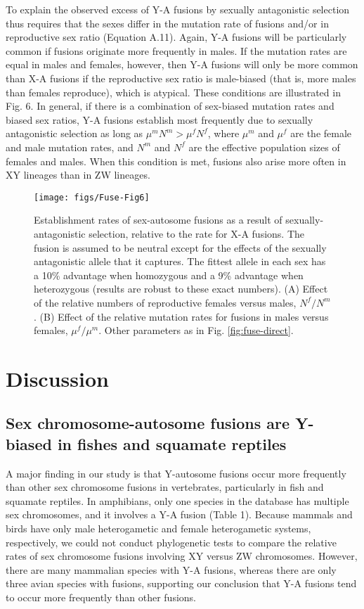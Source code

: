 To explain the observed excess of Y-A fusions by sexually antagonistic selection thus requires that the sexes differ in the mutation rate of fusions and/or in reproductive sex ratio (Equation A.11). Again, Y-A fusions will be particularly common if fusions originate more frequently in males. If the mutation rates are equal in males and females, however, then Y-A fusions will only be more common than X-A fusions if the reproductive sex ratio is male-biased (that is, more males than females reproduce), which is atypical. These conditions are illustrated in Fig. 6. In general, if there is a combination of sex-biased mutation rates and biased sex ratios, Y-A fusions establish most frequently due to sexually antagonistic selection as long as $\mu^m N^m > \mu^fN^f$, where $\mu^m$ and $\mu^f$ are the female and male mutation rates, and $N^m$ and $N^f$ are the effective population sizes of females and males. When this condition is met, fusions also arise more often in XY lineages than in ZW lineages.

\begin{figure}
\centering
\texttt{[image: figs/Fuse-Fig6]}
\caption[Establishment rates of sex-autosome fusions under SA selection]{Establishment rates of sex-autosome fusions as a result of sexually-antagonistic selection, relative to the rate for X-A fusions. The fusion is assumed to be neutral except for the effects of the sexually antagonistic allele that it captures. The fittest allele in each sex has a 10\% advantage when homozygous and a 9\% advantage when heterozygous (results are robust to these exact numbers). (A) Effect of the relative numbers of reproductive females versus males, $N^f/N^m$. (B) Effect of the relative mutation rates for fusions in males versus females, $\mu^f/\mu^m$. Other parameters as in Fig. \ref{fig:fuse-direct}.}
\label{fig:fuse-sa}
\end{figure}

\section{Discussion}

\subsection{Sex chromosome-autosome fusions are Y-biased in fishes and squamate reptiles}

A major finding in our study is that Y-autosome fusions occur more frequently than other sex chromosome fusions in vertebrates, particularly in fish and squamate reptiles. In amphibians, only one species in the database has multiple sex chromosomes, and it involves a Y-A fusion (Table 1). Because mammals and birds have only male heterogametic and female heterogametic systems, respectively, we could not conduct phylogenetic tests to compare the relative rates of sex chromosome fusions involving XY versus ZW chromosomes. However, there are many mammalian species with Y-A fusions, whereas there are only three avian species with fusions, supporting our conclusion that Y-A fusions tend to occur more frequently than other fusions. 

